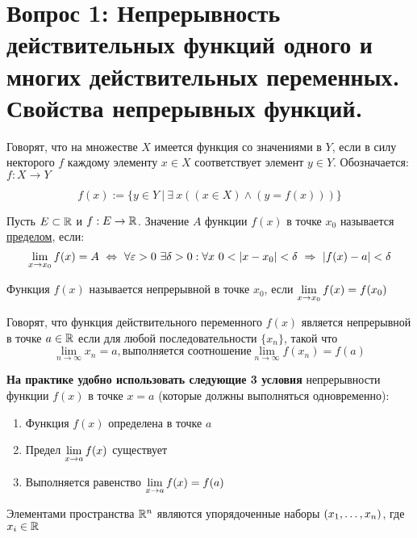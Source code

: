 \section{Вопрос 1: Непрерывность действительных функций одного и многих действительных переменных. Свойства непрерывных функций.}

\begin{defs}
Говорят, что на множестве $X$ имеется функция со значениями в $Y$, если в силу некторого $f$ каждому элементу $x \in X$ соответствует элемент $y \in Y$. Обозначается: $f: X \to Y$

$$f(x) := \{ y \in Y \ | \ \exists \ x ((x\in X) \wedge (y = f(x))) \} $$
\end{defs}


\begin{defs}
	Пусть $E \subset \mathbb{R}$ и $f: E \to \mathbb{R}$. Значение $A$ функции $f(x)$ в точке $x_0$ называется \underline{пределом}, если:
	$$\lim_{x\to x_0} f(x) = A \ \Leftrightarrow \ \forall \varepsilon > 0 \ \exists \delta > 0: \forall x \ 0 < \left| x - x_0\right| < \delta \ \Rightarrow \ \left| f(x) - a\right| < \delta$$
\end{defs}

\begin{defs}
	Функция $f(x)$ называется непрерывной в точке $x_0$, если $\lim\limits_{x \to x_0}f(x) = f(x_0)$
\end{defs}

\begin{defs}
	Говорят, что функция действительного переменного $f(x)$ является непрерывной в точке $a \in \mathbb{R}$ если для любой последовательности $\{x_n\}$, такой что
	$$\lim_{n \to \infty}x_n = a, \text{выполняется соотношение} \lim_{n \to \infty}f(x_n) = f(a)$$
\end{defs}

\textbf{На практике удобно использовать следующие 3 условия} непрерывности функции $f(x)$ в точке $x = a$ (которые должны выполняться одновременно):
\begin{enumerate}
	\item Функция $f(x)$ определена в точке $a$
	\item Предел $\lim\limits_{x \to a}f(x)$ существует
	\item Выполняется равенство $\lim\limits_{x \to a}f(x)= f(a)$
\end{enumerate}

\begin{defs}
	Элементами пространства $\mathbb{R}^n$ являются упорядоченные наборы $\left(x_1,\ldots,x_n\right)$, где $x_i \in \mathbb{R}$
\end{defs}

